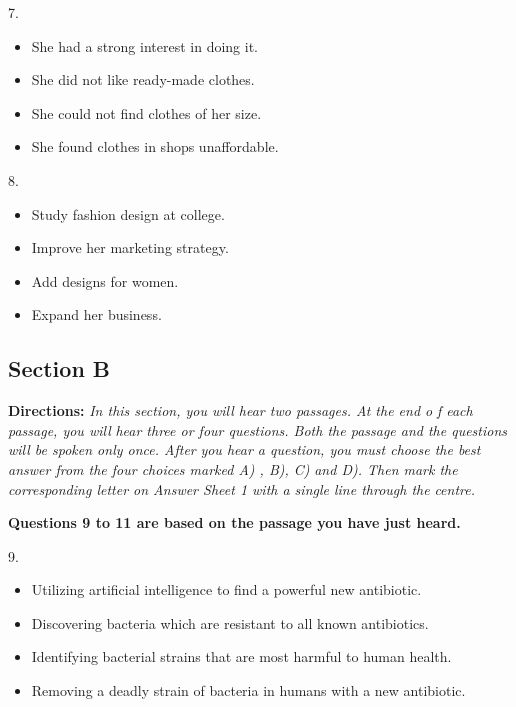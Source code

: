\documentclass[UTF8,11pt]{ctexart}
\begin{document}
7.


\begin{itemize}[leftmargin=2em,itemsep=.2em,topsep=.4em]\item[A.] She had a strong interest in doing it.
\item[B.] She did not like ready-made clothes.
\item[C.] She could not find clothes of her size.
\item[D.] She found clothes in shops unaffordable.
\end{itemize}

8.


\begin{itemize}[leftmargin=2em,itemsep=.2em,topsep=.4em]\item[A.] Study fashion design at college.
\item[B.] Improve her marketing strategy.
\item[C.] Add designs for women.
\item[D.] Expand her business.
\end{itemize}

\subsection*{\textbf{Section B}}


\textbf{Directions: }\textit{In this section, you will hear two passages. At the end o} \textit{f each passage, you will} \textit{hear three or four questions. Both the passage and the questions will be spoken only once. After} \textit{you hear a question, you must choose the best answer from the four choices marked A) , B), C)} \textit{and D). Then mark the corresponding letter on Answer Sheet 1 with a single line through the} \textit{centre.}


\textbf{Questions 9 to 11 are based on the passage you have just heard.}


9.


\begin{itemize}[leftmargin=2em,itemsep=.2em,topsep=.4em]\item[A.] Utilizing artificial intelligence to find a powerful new antibiotic.
\item[B.] Discovering bacteria which are resistant to all known antibiotics.
\item[C.] Identifying bacterial strains that are most harmful to human health.
\item[D.] Removing a deadly strain of bacteria in humans with a new antibiotic.
\end{itemize}
\end{document}
